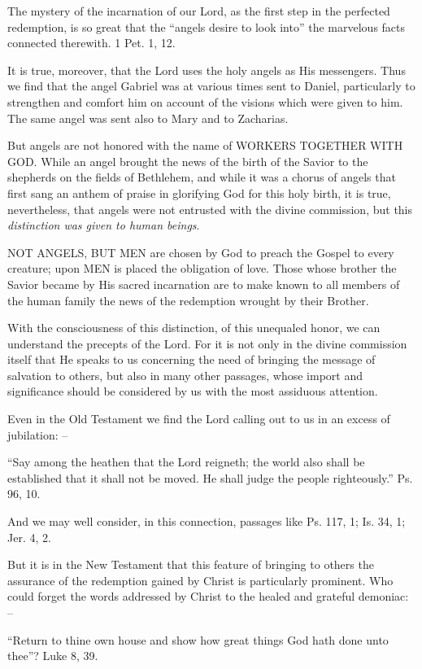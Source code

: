 \documentclass[
]{book}
\begin{document}
The mystery of the incarnation of our Lord, as the first step in the perfected redemption, is so great that the ``angels desire to look into'' the marvelous facts connected therewith. 1 Pet. 1, 12.

It is true, moreover, that the Lord uses the holy angels as His messengers. Thus we find that the angel Gabriel was at various times sent to Daniel, particularly to strengthen and comfort him on account of the visions which were given to him. The same angel was sent also to Mary and to Zacharias.

But angels are not honored with the name of WORKERS TOGETHER WITH GOD. While an angel brought the news of the birth of the Savior to the shepherds on the fields of Bethlehem, and while it was a chorus of angels that first sang an anthem of praise in glorifying God for this holy birth, it is true, nevertheless, that angels were not entrusted with the divine commission, but this \emph{distinction was given to human beings}.

NOT ANGELS, BUT MEN are chosen by God to preach the Gospel to every creature; upon MEN is placed the obligation of love. Those whose brother the Savior became by His sacred incarnation are to make known to all members of the human family the news of the redemption wrought by their Brother.

With the consciousness of this distinction, of this unequaled honor, we can understand the precepts of the Lord. For it is not only in the divine commission itself that He speaks to us concerning the need of bringing the message of salvation to others, but also in many other passages, whose import and significance should be considered by us with the most assiduous attention.

Even in the Old Testament we find the Lord calling out to us in an excess of jubilation: --

``Say among the heathen that the Lord reigneth; the world also shall be established that it shall not be moved. He shall judge the people righteously.'' Ps. 96, 10.

And we may well consider, in this connection, passages like Ps. 117, 1; Is. 34, 1; Jer. 4, 2.

But it is in the New Testament that this feature of bringing to others the assurance of the redemption gained by Christ is particularly prominent. Who could forget the words addressed by Christ to the healed and grateful demoniac: --

``Return to thine own house and show how great things God hath done unto thee''? Luke 8, 39.
\end{document}
